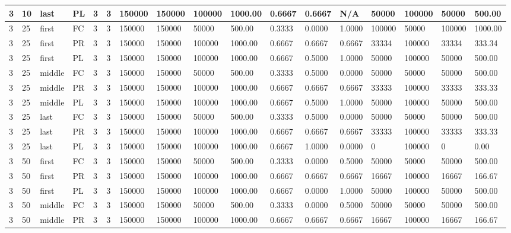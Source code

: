 \begin{tabular}{|l|l|l|l|l|l|l|l|l|l|l|l|l|l|l|l|l|}
3 & 10 & last & PL & 3 & 3 & 150000 & 150000 & 100000 & 1000.00 & 0.6667 & 0.6667 & N/A & 50000 & 100000 & 50000 & 500.00 \\ \hline
3 & 25 & first & FC & 3 & 3 & 150000 & 150000 & 50000 & 500.00 & 0.3333 & 0.0000 & 1.0000 & 100000 & 50000 & 100000 & 1000.00 \\ \hline
3 & 25 & first & PR & 3 & 3 & 150000 & 150000 & 100000 & 1000.00 & 0.6667 & 0.6667 & 0.6667 & 33334 & 100000 & 33334 & 333.34 \\ \hline
3 & 25 & first & PL & 3 & 3 & 150000 & 150000 & 100000 & 1000.00 & 0.6667 & 0.5000 & 1.0000 & 50000 & 100000 & 50000 & 500.00 \\ \hline
3 & 25 & middle & FC & 3 & 3 & 150000 & 150000 & 50000 & 500.00 & 0.3333 & 0.5000 & 0.0000 & 50000 & 50000 & 50000 & 500.00 \\ \hline
3 & 25 & middle & PR & 3 & 3 & 150000 & 150000 & 100000 & 1000.00 & 0.6667 & 0.6667 & 0.6667 & 33333 & 100000 & 33333 & 333.33 \\ \hline
3 & 25 & middle & PL & 3 & 3 & 150000 & 150000 & 100000 & 1000.00 & 0.6667 & 0.5000 & 1.0000 & 50000 & 100000 & 50000 & 500.00 \\ \hline
3 & 25 & last & FC & 3 & 3 & 150000 & 150000 & 50000 & 500.00 & 0.3333 & 0.5000 & 0.0000 & 50000 & 50000 & 50000 & 500.00 \\ \hline
3 & 25 & last & PR & 3 & 3 & 150000 & 150000 & 100000 & 1000.00 & 0.6667 & 0.6667 & 0.6667 & 33333 & 100000 & 33333 & 333.33 \\ \hline
3 & 25 & last & PL & 3 & 3 & 150000 & 150000 & 100000 & 1000.00 & 0.6667 & 1.0000 & 0.0000 & 0 & 100000 & 0 & 0.00 \\ \hline
3 & 50 & first & FC & 3 & 3 & 150000 & 150000 & 50000 & 500.00 & 0.3333 & 0.0000 & 0.5000 & 50000 & 50000 & 50000 & 500.00 \\ \hline
3 & 50 & first & PR & 3 & 3 & 150000 & 150000 & 100000 & 1000.00 & 0.6667 & 0.6667 & 0.6667 & 16667 & 100000 & 16667 & 166.67 \\ \hline
3 & 50 & first & PL & 3 & 3 & 150000 & 150000 & 100000 & 1000.00 & 0.6667 & 0.0000 & 1.0000 & 50000 & 100000 & 50000 & 500.00 \\ \hline
3 & 50 & middle & FC & 3 & 3 & 150000 & 150000 & 50000 & 500.00 & 0.3333 & 0.0000 & 0.5000 & 50000 & 50000 & 50000 & 500.00 \\ \hline
3 & 50 & middle & PR & 3 & 3 & 150000 & 150000 & 100000 & 1000.00 & 0.6667 & 0.6667 & 0.6667 & 16667 & 100000 & 16667 & 166.67 \\ \hline

\end{tabular}
